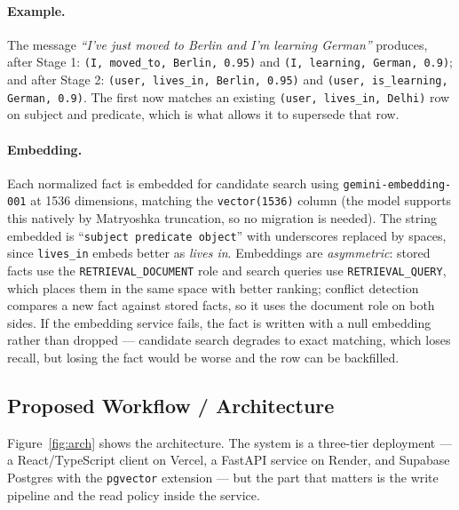 \documentclass[11pt,a4paper]{article}
\begin{document}
\paragraph{Example.} The message \emph{``I've just moved to Berlin and I'm
learning German''} produces, after Stage 1:
\texttt{(I, moved\_to, Berlin, 0.95)} and
\texttt{(I, learning, German, 0.9)}; and after Stage 2:
\texttt{(user, lives\_in, Berlin, 0.95)} and
\texttt{(user, is\_learning, German, 0.9)}. The first now matches an existing
\texttt{(user, lives\_in, Delhi)} row on subject and predicate, which is what
allows it to supersede that row.

\paragraph{Embedding.} Each normalized fact is embedded for candidate search
using \texttt{gemini-embedding-001} at 1536 dimensions, matching the
\texttt{vector(1536)} column (the model supports this natively by Matryoshka
truncation, so no migration is needed). The string embedded is
``\texttt{subject predicate object}'' with underscores replaced by spaces, since
\texttt{lives\_in} embeds better as \emph{lives in}. Embeddings are
\emph{asymmetric}: stored facts use the \texttt{RETRIEVAL\_DOCUMENT} role and
search queries use \texttt{RETRIEVAL\_QUERY}, which places them in the same
space with better ranking; conflict detection compares a new fact against stored
facts, so it uses the document role on both sides. If the embedding service
fails, the fact is written with a null embedding rather than dropped ---
candidate search degrades to exact matching, which loses recall, but losing the
fact would be worse and the row can be backfilled.

\subsection{Proposed Workflow / Architecture}
\label{sec:arch}

Figure~\ref{fig:arch} shows the architecture. The system is a three-tier
deployment --- a React/TypeScript client on Vercel, a FastAPI service on
Render, and Supabase Postgres with the \texttt{pgvector} extension --- but the
part that matters is the write pipeline and the read policy inside the service.
\end{document}
